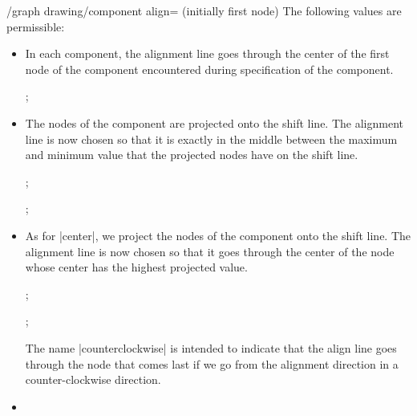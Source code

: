 \begin{key}{/graph drawing/component align= (initially first node)}
  The following values are permissible:
  \begin{itemize}
  \item {}
    In each component, the alignment line goes through the center of
    the first node of the component encountered during specification
    of the component.
\begin{codeexample}[]
\tikz {};
\end{codeexample}
  \item {}
    
    The nodes of the component are projected onto the shift line. The
    alignment line is now chosen so that it is exactly in the middle
    between the maximum and minimum value that the projected nodes
    have on the shift line.
\begin{codeexample}[]
\tikz {};
\end{codeexample}
\begin{codeexample}[]
\tikz {};
\end{codeexample}
  \item {}

    As for |center|, we project the nodes of the component onto the
    shift line. The alignment line is now chosen so that it goes
    through the center of the node whose center has the highest
    projected value.
\begin{codeexample}[]
\tikz {};
\end{codeexample}
\begin{codeexample}[]
\tikz {};
\end{codeexample}
    The name |counterclockwise| is intended to indicate that the align
    line goes through the node that comes last if we go from the
    alignment direction in a counter-clockwise direction.
  \item {}
    

\end{itemize}
\end{key}
